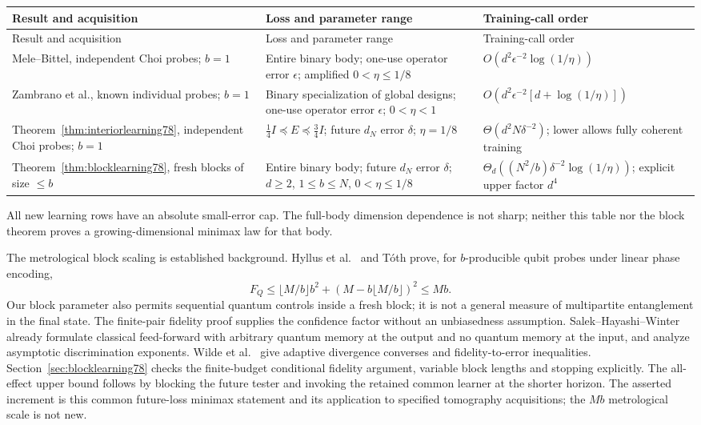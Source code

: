 \begingroup
\small
\setlength{\tabcolsep}{4pt}
\renewcommand{\arraystretch}{1.17}
\begin{longtable}{@{}p{}p{}p{}@{}}
\toprule
Result and acquisition & Loss and parameter range & Training-call order\\
\midrule
\endfirsthead
\toprule
Result and acquisition & Loss and parameter range & Training-call order\\
\midrule
\endhead
Mele--Bittel, independent Choi probes; $b=1$ &
Entire binary body; one-use operator error $\epsilon$;
amplified $0<\eta\le1/8$ &
$O(d^2\epsilon^{-2}\log(1/\eta))$\\
Zambrano et al., known individual probes; $b=1$ &
Binary specialization of global designs; one-use operator error
$\epsilon$; $0<\eta<1$ &
$O(d^2\epsilon^{-2}[d+\log(1/\eta)])$\\
Theorem~\ref{thm:interiorlearning78}, independent Choi probes;
$b=1$ &
$\tfrac14I\preceq E\preceq\tfrac34I$;
future $d_N$ error $\delta$; $\eta=1/8$ &
$\Theta(d^2N\delta^{-2})$;
lower allows fully coherent training\\
Theorem~\ref{thm:blocklearning78}, fresh blocks of size $\le b$ &
Entire binary body; future $d_N$ error $\delta$;
$d\ge2$, $1\le b\le N$,
$0<\eta\le1/8$ &
$\Theta_d((N^2/b)\delta^{-2}\log(1/\eta))$;
explicit upper factor $d^4$\\
\bottomrule
\end{longtable}
\endgroup
All new learning rows have an absolute small-error cap.
The full-body dimension dependence is not sharp; neither this table
nor the block theorem proves a growing-dimensional minimax law
for that body.

The metrological block scaling is established background.
Hyllus et al.\ \cite[Observation~1, equation~(9)]{Hyllus78} and
T\'oth \cite[Observation~3, equation~(6)]{Toth78} prove, for
$b$-producible qubit probes under linear phase encoding,
\[
 F_Q\le \lfloor M/b\rfloor b^2+
              (M-b\lfloor M/b\rfloor)^2\le Mb.
\]
Our block parameter also permits sequential quantum controls inside
a fresh block; it is not a general measure of multipartite
entanglement in the final state. The finite-pair fidelity proof
supplies the confidence factor without an unbiasedness assumption.
Salek--Hayashi--Winter \cite[Section~II.2 and Section~V.2]{SHW68}
already formulate classical feed-forward with arbitrary quantum
memory at the output and no quantum memory at the input, and
analyze asymptotic discrimination exponents.
Wilde et al.\ \cite[Proposition~21 and Appendix~B]{WBHK72} give
adaptive divergence converses and fidelity-to-error inequalities.
Section~\ref{sec:blocklearning78} checks the finite-budget
conditional fidelity argument, variable block lengths and stopping
explicitly. The all-effect upper bound follows by blocking the
future tester and invoking the retained common learner at the
shorter horizon. The asserted increment is this common
future-loss minimax statement and its application to specified
tomography acquisitions; the $Mb$ metrological scale is not new.

